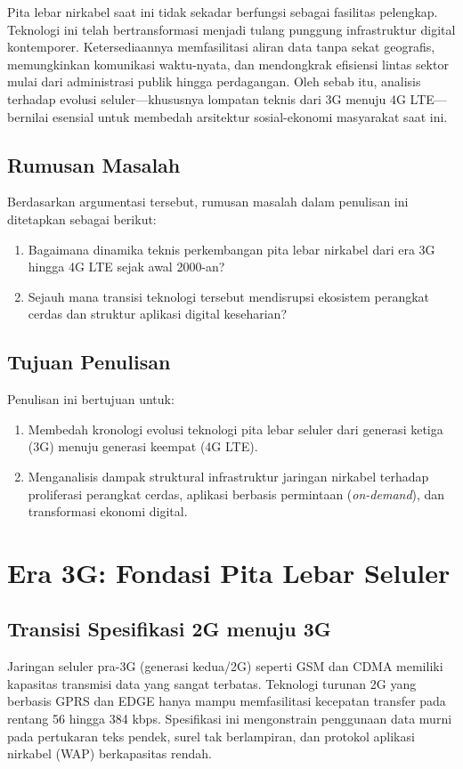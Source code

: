 \documentclass[12pt,a4paper]{article}
\begin{document}
Pita lebar nirkabel saat ini tidak sekadar berfungsi sebagai fasilitas pelengkap. Teknologi ini telah bertransformasi menjadi tulang punggung infrastruktur digital kontemporer. Ketersediaannya memfasilitasi aliran data tanpa sekat geografis, memungkinkan komunikasi waktu-nyata, dan mendongkrak efisiensi lintas sektor mulai dari administrasi publik hingga perdagangan. Oleh sebab itu, analisis terhadap evolusi seluler—khususnya lompatan teknis dari 3G menuju 4G LTE—bernilai esensial untuk membedah arsitektur sosial-ekonomi masyarakat saat ini.

\subsection{Rumusan Masalah}
Berdasarkan argumentasi tersebut, rumusan masalah dalam penulisan ini ditetapkan sebagai berikut:
\begin{enumerate}
\item Bagaimana dinamika teknis perkembangan pita lebar nirkabel dari era 3G hingga 4G LTE sejak awal 2000-an?
\item Sejauh mana transisi teknologi tersebut mendisrupsi ekosistem perangkat cerdas dan struktur aplikasi digital keseharian?
\end{enumerate}

\subsection{Tujuan Penulisan}
Penulisan ini bertujuan untuk:
\begin{enumerate}
\item Membedah kronologi evolusi teknologi pita lebar seluler dari generasi ketiga (3G) menuju generasi keempat (4G LTE).
\item Menganalisis dampak struktural infrastruktur jaringan nirkabel terhadap proliferasi perangkat cerdas, aplikasi berbasis permintaan (\textit{on-demand}), dan transformasi ekonomi digital.
\end{enumerate}

\newpage

\section{Era 3G: Fondasi Pita Lebar Seluler}

\subsection{Transisi Spesifikasi 2G menuju 3G}
Jaringan seluler pra-3G (generasi kedua/2G) seperti GSM dan CDMA memiliki kapasitas transmisi data yang sangat terbatas. Teknologi turunan 2G yang berbasis GPRS dan EDGE hanya mampu memfasilitasi kecepatan transfer pada rentang 56 hingga 384 kbps. Spesifikasi ini mengonstrain penggunaan data murni pada pertukaran teks pendek, surel tak berlampiran, dan protokol aplikasi nirkabel (WAP) berkapasitas rendah.
\end{document}
